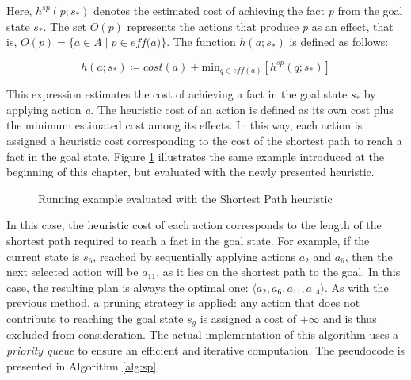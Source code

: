 Here, $h^{sp}\left(p;s_*\right)$ denotes the estimated cost of achieving the fact \textit{p} from the goal state $s_*$.
The set $O\left(p\right)$ represents the actions that produce \textit{p} as an effect,
that is, $O\left(p\right) = \{a \in A \mid p \in \textit{eff(a)}\}$. The function $h\left(a;s_*\right)$ is
defined as follows:

\begin{equation}
	\label{eq:spcost}
	h\left(a;s_*\right) \coloneqq cost(a) + \text{min}_{q \in \textit{eff}\left(a\right)} \left[h^{sp}\left(q;s_*\right)\right]
\end{equation}

This expression estimates the cost of achieving a fact in the goal state $s_*$ by applying
action \textit{a}. The heuristic cost of an action is defined as its own cost plus the minimum estimated cost among its effects.
In this way, each action is assigned a heuristic cost corresponding to the cost of the shortest path to reach
a fact in the goal state.
Figure \ref{fig:sp_scheme} illustrates the same example introduced at the beginning of this chapter, but evaluated with the newly presented heuristic.

\begin{figure}[ht]
	\centering
	\def\svgwidth{0.75\linewidth}
	
	\caption{Running example evaluated with the Shortest Path heuristic}
	\label{fig:sp_scheme}
\end{figure}

In this case, the heuristic cost of each action corresponds to the length of the shortest path required to reach a fact in the goal state.
For example, if the current state is $s_6$, reached by sequentially applying actions $a_2$ and $a_6$, then the next selected action will be $a_{11}$,
as it lies on the shortest path to the goal.
In this case, the resulting plan is always the optimal one: $\langle a_2, a_6, a_{11}, a_{14}\rangle$.
As with the previous method, a pruning strategy is applied: any action that does not contribute to reaching the goal state $s_g$ is
assigned a cost of $+\infty$ and is thus excluded from consideration.
The actual implementation of this algorithm uses a \textit{priority queue} to ensure an
efficient and iterative computation. The pseudocode is presented in Algorithm \ref{alg:sp}.

